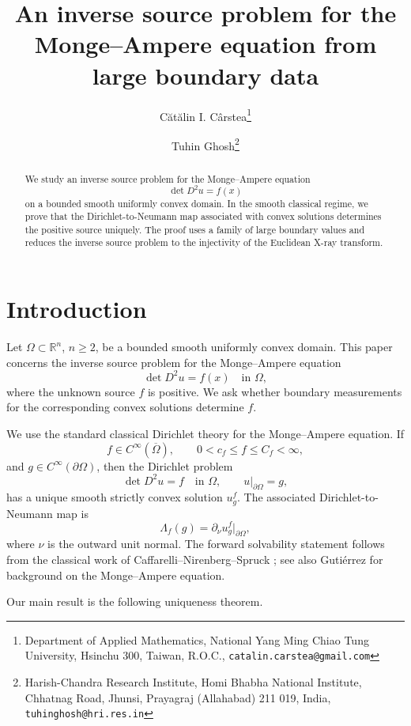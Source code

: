 \documentclass[11pt]{article}
\title{An inverse source problem for the Monge--Ampere equation from large boundary data}
\author{%
C\u{a}t\u{a}lin I. C\^{a}rstea\thanks{
Department of Applied Mathematics,
National Yang Ming Chiao Tung University,
Hsinchu 300, Taiwan, R.O.C.,
\texttt{catalin.carstea@gmail.com}}
\and
Tuhin Ghosh\thanks{
Harish-Chandra Research Institute, Homi Bhabha National Institute,
Chhatnag Road, Jhunsi, Prayagraj (Allahabad) 211 019, India,
\texttt{tuhinghosh@hri.res.in}}}
\date{}
\numberwithin{equation}{section}
\newcommand{\R}{\mathbb R}
\newcommand{\Om}{\Omega}
\newcommand{\DN}{\Lambda}
\begin{document}
\maketitle

\begin{abstract}
We study an inverse source problem for the Monge--Ampere equation
\[
    \det D^2u=f(x)
\]
on a bounded smooth uniformly convex domain.  In the smooth classical regime, we prove that the Dirichlet-to-Neumann map associated with convex solutions determines the positive source uniquely.  The proof uses a family of large boundary values and reduces the inverse source problem to the injectivity of the Euclidean X-ray transform.
\end{abstract}


\section{Introduction}

Let \(\Om\subset\R^n\), \(n\ge2\), be a bounded smooth uniformly convex domain.  This paper concerns the inverse source problem for the Monge--Ampere equation
\begin{equation}\label{eq:MA}
    \det D^2u=f(x)\quad\text{in }\Om,
\end{equation}
where the unknown source \(f\) is positive.  We ask whether boundary measurements for the corresponding convex solutions determine \(f\).

We use the standard classical Dirichlet theory for the Monge--Ampere equation.  If
\[
    f\in C^\infty(\overline\Om),
    \qquad
    0<c_f\le f\le C_f<\infty,
\]
and \(g\in C^\infty(\partial\Om)\), then the Dirichlet problem
\begin{equation}\label{eq:MA-intro-dirichlet}
    \det D^2u=f
    \quad\text{in }\Om,
    \qquad
    u|_{\partial\Om}=g,
\end{equation}
has a unique smooth strictly convex solution \(u_g^f\).  The associated Dirichlet-to-Neumann map is
\begin{equation}\label{eq:DN-intro}
    \DN_f(g)=\partial_\nu u_g^f|_{\partial\Om},
\end{equation}
where \(\nu\) is the outward unit normal.  The forward solvability statement follows from the classical work of Caffarelli--Nirenberg--Spruck \cite{CaffarelliNirenbergSpruck1984}; see also Guti\'errez \cite{Gutierrez2016} for background on the Monge--Ampere equation.

Our main result is the following uniqueness theorem.
\end{document}
